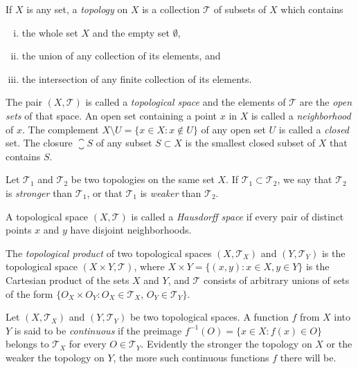 \begin{para}
  If $X$ is any set, a \emph{topology} on $X$ is a collection $\mathcal{T}$
  of subsets of $X$ which contains
  \begin{enumerate}[(i)]
    \item the whole set $X$ and the empty set $\emptyset$,
    \item the union of any collection of its elements, and
    \item the intersection of any finite collection of its elements.
  \end{enumerate}
  The pair $(X,\mathcal{T})$ is called a \emph{topological space}
  and the elements of $\mathcal{T}$ are the \emph{open sets} of that space.
  An open set containing a point $x$ in $X$ is called a \emph{neighborhood}
  of $x$. The complement $X\setminus U = \{x\in X\colon x\notin U\}$
  of any open set $U$ is called a \emph{closed} set.
  The closure $\closure{S}$ of any subset $S\subset X$ is the smallest
  closed subset of $X$ that contains $S$.

  Let $\mathcal{T}_1$ and $\mathcal{T}_2$ be two topologies on the same set $X$.
  If $\mathcal{T}_1\subset \mathcal{T}_2$, we say that $\mathcal{T}_2$ is
  \emph{stronger} than $\mathcal{T}_1$, or that $\mathcal{T}_1$ is \emph{weaker}
  than $\mathcal{T}_2$.

  A topological space $(X,\mathcal{T})$ is called a \emph{Hausdorff space} if every
  pair of distinct points $x$ and $y$ have disjoint neighborhoods.

  The \emph{topological product} of two topological spaces $(X,\mathcal{T}_X)$
  and $(Y,\mathcal{T}_Y)$ is the topological space $(X\times Y,\mathcal{T})$,
  where $X\times Y = \{(x,y)\colon x\in X, y\in Y\}$ is the Cartesian product
  of the sets $X$ and $Y$, and $\mathcal{T}$ consists of arbitrary unions of
  sets of the form $\{O_X\times O_Y\colon O_X\in\mathcal{T}_X,\,O_Y\in\mathcal{T}_Y\}$.

  Let $(X,\mathcal{T}_X)$ and $(Y,\mathcal{T}_Y)$ be two topological spaces.
  A function $f$ from $X$ into $Y$ is said to be \emph{continuous}
  if the preimage $f^{-1}(O) = \{x\in X\colon f(x)\in O\}$
  belongs to $\mathcal{T}_X$ for every $O\in \mathcal{T}_Y$.
  Evidently the stronger the topology on $X$ or the weaker the topology on $Y$,
  the more such continuous functions $f$ there will be.
\end{para}


